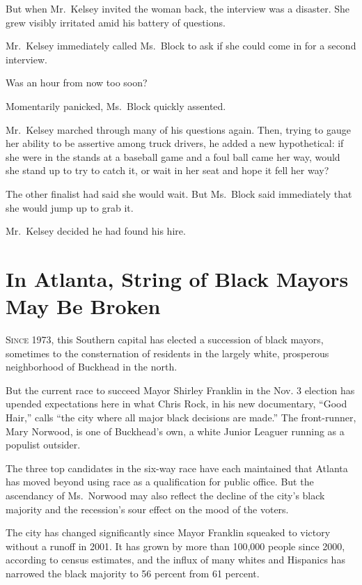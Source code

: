 ﻿\documentclass[12pt]{article}
\begin{document}
But when Mr.~Kelsey invited the woman back, the interview was a disaster. She grew visibly irritated
amid his battery of questions.

Mr.~Kelsey immediately called Ms.~Block to ask if she could come in for a second interview.

Was an hour from now too soon?

Momentarily panicked, Ms.~Block quickly assented.

Mr.~Kelsey marched through many of his questions again. Then, trying to gauge her ability to be
assertive among truck drivers, he added a new hypothetical: if she were in the stands at a baseball
game and a foul ball came her way, would she stand up to try to catch it, or wait in her seat and
hope it fell her way?

The other finalist had said she would wait. But Ms.~Block said immediately that she would jump up to
grab it.

Mr.~Kelsey decided he had found his hire.

\section{In Atlanta, String of Black Mayors May Be Broken}

\lettrine{S}{ince} 1973, this Southern capital has elected a succession of
black mayors, sometimes to the consternation\cite{consternation} of residents in the largely white,
prosperous neighborhood of Buckhead in the north.

But the current race to succeed Mayor Shirley Franklin in the Nov. 3 election has upended
expectations here in what Chris Rock, in his new documentary, ``Good Hair,'' calls ``the city where
all major black decisions are made.'' The front-runner, Mary Norwood, is one of Buckhead's own, a
white Junior Leaguer running as a populist outsider.

The three top candidates in the six-way race have each maintained that Atlanta has moved beyond
using race as a qualification for public office. But the ascendancy of Ms.~Norwood may also reflect
the decline of the city's black majority and the recession's sour effect on the mood of the voters.

The city has changed significantly since Mayor Franklin squeaked\cite{squeak} to victory without a
runoff in 2001. It has grown by more than 100,000 people since 2000, according to census estimates,
and the influx of many whites and Hispanics has narrowed the black majority to 56 percent from 61
percent.
\end{document}
